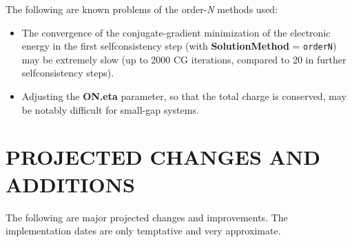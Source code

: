The following are known problems of the order-{\it N} methods used:

\begin{itemize}

\item
The convergence of the conjugate-gradient minimization of the
electronic energy in the first selfconsistency step (with
{\bf SolutionMethod} = {\tt orderN}) may be extremely slow 
(up to 2000 CG iterations, compared to 20 in further 
selfconsistency steps).

\item
Adjusting the {\bf ON.eta} parameter, so that the total charge
is conserved, may be notably difficult for small-gap systems.

\end{itemize}


%
%




\section{PROJECTED CHANGES AND ADDITIONS}

The following are major projected changes and improvements.
The implementation dates are only temptative and very approximate.

